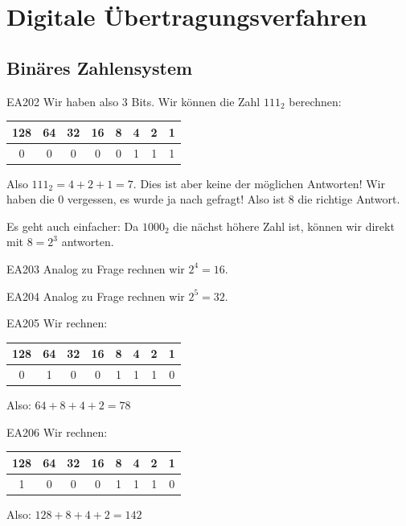 \setcounter{section}{11}
\section{Digitale Übertragungsverfahren}
\subsection{Binäres Zahlensystem} \label{sec:binär}



\begin{sol}{EA202}
  Wir haben also 3 Bits. Wir können die Zahl $111_2$ berechnen:
    \begin{center}
  \begin{tabular}{|c|c|c|c|c|c|c|c|} 
    128& 64&32&16 &8 & 4 & 2 & 1 \\ \hline
    0&0&0&0&0&1&1&1
  \end{tabular} 
  \end{center}
Also $111_2 = 4+2+1 = 7$. Dies ist aber keine der möglichen Antworten! Wir haben die 0 vergessen, es wurde ja nach  gefragt! Also ist 8 die richtige Antwort.

Es geht auch einfacher: Da $1000_2$ die nächst höhere Zahl ist, können wir direkt mit $8 = 2^3$ antworten.
\end{sol}


\begin{sol}{EA203}
Analog zu Frage  rechnen wir $2^4 = 16$.
\end{sol}

\begin{sol}{EA204}
Analog zu Frage  rechnen wir $2^5 = 32$.
\end{sol}


\begin{sol}{EA205}
  Wir rechnen:
  \begin{center}
\begin{tabular}{|c|c|c|c|c|c|c|c|} 
128& 64&32&16 &8 & 4 & 2 & 1 \\ \hline
0&1&0&0&1&1&1&0
\end{tabular}

\end{center}
Also: $64+8+4+2 = 78$ 
\end{sol} 

\begin{sol}{EA206}
  Wir rechnen:
  \begin{center}
\begin{tabular}{|c|c|c|c|c|c|c|c|} 
128& 64&32&16 &8 & 4 & 2 & 1 \\ \hline
1&0&0&0&1&1&1&0
\end{tabular}

\end{center}
Also: $128+8+4+2 = 142$ 
\end{sol}  



